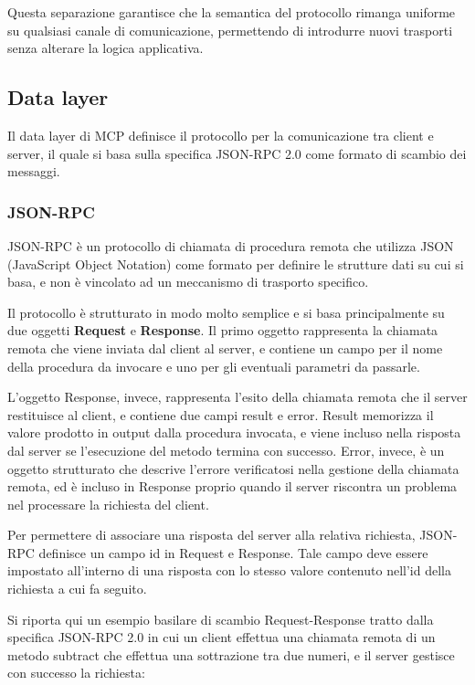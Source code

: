 Questa separazione garantisce che la semantica del protocollo rimanga
uniforme su qualsiasi canale di comunicazione, permettendo di introdurre
nuovi trasporti senza alterare la logica applicativa.

\subsection{Data layer}\label{data-layer}

Il data layer di MCP definisce il protocollo per la comunicazione tra
client e server, il quale si basa sulla specifica JSON-RPC 2.0 come
formato di scambio dei messaggi.

\subsubsection{JSON-RPC}\label{json-rpc}

JSON-RPC è un protocollo di chiamata di procedura remota che utilizza
JSON (JavaScript Object Notation) come formato per definire le strutture
dati su cui si basa, e non è vincolato ad un meccanismo di trasporto
specifico.

Il protocollo è strutturato in modo molto semplice e si basa
principalmente su due oggetti \textbf{Request} e \textbf{Response}. Il
primo oggetto rappresenta la chiamata remota che viene inviata dal
client al server, e contiene un campo per il nome della procedura da
invocare e uno per gli eventuali parametri da passarle.

L'oggetto Response, invece, rappresenta l'esito della chiamata remota che
il server restituisce al client, e contiene due campi result e error.
Result memorizza il valore prodotto in output dalla procedura invocata,
e viene incluso nella risposta dal server se l'esecuzione del metodo
termina con successo. Error, invece, è un oggetto strutturato che
descrive l'errore verificatosi nella gestione della chiamata remota, ed è
incluso in Response proprio quando il server riscontra un problema nel
processare la richiesta del client.

Per permettere di associare una risposta del server alla relativa
richiesta, JSON-RPC definisce un campo id in Request e Response. Tale
campo deve essere impostato all'interno di una risposta con lo stesso
valore contenuto nell'id della richiesta a cui fa seguito.

Si riporta qui un esempio basilare di scambio Request-Response tratto
dalla specifica JSON-RPC 2.0 in cui un client effettua una chiamata remota
di un metodo subtract che effettua una sottrazione tra due numeri, e il
server gestisce con successo la richiesta:

